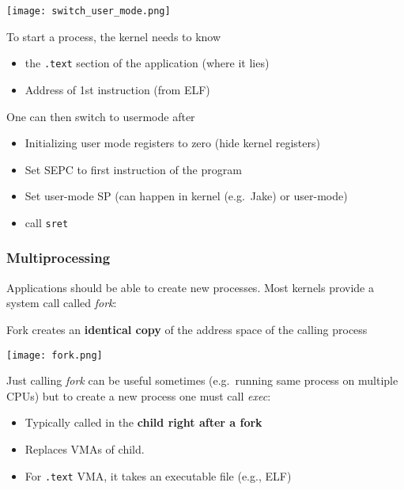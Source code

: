 \newpar{}
\begin{center}
    \texttt{[image: switch\_user\_mode.png]}
\end{center}
To start a process, the kernel needs to know
\begin{itemize}
    \item the \texttt{.text} section of the application (where it lies)
    \item Address of 1st instruction (from ELF)
\end{itemize}
One can then switch to usermode after
\begin{itemize}
    \item Initializing user mode registers to zero (hide kernel registers)
    \item Set SEPC to first instruction of the program
    \item Set user-mode SP (can happen in kernel (e.g.\ Jake) or user-mode)
    \item call \texttt{sret}
\end{itemize}

\subsubsection{Multiprocessing}
Applications should be able to create new processes. Most kernels provide a system call called \textit{fork}:

\newpar{}

Fork creates an \textbf{identical copy} of the address space of the calling process
\begin{center}
    \texttt{[image: fork.png]}
\end{center}

Just calling \textit{fork} can be useful sometimes (e.g.\ running same process on multiple CPUs) but to create a new process one must call \textit{exec}:

\begin{itemize}
    \item Typically called in the \textbf{child right after a fork}
    \item Replaces VMAs of child. 
    \item For \texttt{.text} VMA, it takes an executable file (e.g., ELF)
\end{itemize}

\newpar{}

